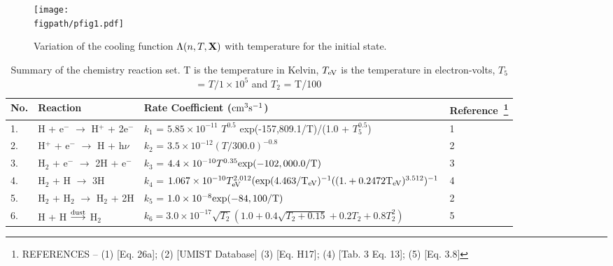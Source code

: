 \documentclass[useAMS,usenatbib]{mn2e}
\newcommand{\figpath}{/home/phybva/SiOJets_New/PAPER/NEWFIGS}
\begin{document}
\begin{figure}
\texttt{[image: \\figpath/pfig1.pdf]}
 \caption{Variation of the cooling
   function $\Lambda(n,T,{\bf{X}})$ with temperature for the initial
   state.}
\label{fig:tempvar}
\end{figure}

\begin{table*}
\begin{minipage}{\textwidth}
\caption{Summary of the chemistry reaction set. T is the temperature
  in Kelvin, $T_{\rm eV}$ is the temperature in electron-volts, $T_{5}$
  = $T/1\times10^{5}$  and 
$T_{2}$  = T/100}
\label{tab:chemeq}
\begin{tabular}{l l l l}
\hline
No. & Reaction & Rate Coefficient ($\rm {cm}^{3} s^{-1}$) &
Reference~\footnote{REFERENCES -- (1) \cite{Cen:1992p13616} [Eq. 26a];
  (2) \cite{Woodall:2007p13623} [UMIST Database] (3)
  \cite{Galli:1998p13066} [Eq. H17]; (4) \cite{Abel:1997p12836}
  [Tab. 3 Eq. 13]; (5) \cite{Hollenbach:1979p12707} [Eq. 3.8]}\\
\hline
1. & H + e$^{-}$ $\rightarrow$ H$^{+}$ + 2e$^{-}$ & $k_1$ = $5.85
\times 10^{-11}$ $T^{0.5}$ \rm{exp}(-157,809.1/T)/(1.0 + $T_{5}^{0.5}$) & 1\\
2. & H$^{+}$ + e$^{-}$ $\rightarrow$ H + h$\nu$ & $k_2$ =
$3.5\times10^{-12} (T/300.0)^{-0.8}$ & 2\\
3. & H$_{2}$ + e$^{-}$ $\rightarrow$ 2H + e$^{-}$ & $k_3$ =
$4.4\times10^{-10} T^{0.35} \rm{exp}(-102,000.0/T)$ & 3\\
4. & H$_{2}$ + H $\rightarrow$ 3H & $k_4$ = $1.067\times10^{-10}
T_{\rm eV}^{2.012}(\rm{exp}(4.463/T_{\rm eV})^{-1}((1. + 0.2472 T_{\rm eV})^{3.512})^{-1} $& 4\\
5. &H$_{2}$ + H$_{2}$ $\rightarrow$ H$_{2}$ + 2H & $k_5$ = $1.0\times 10^{-8} \rm{exp}(-84,100/T)$ & 2\\
6. & H + H $\overset{\rm dust}\longrightarrow$ H$_{2}$ & $k_6 =
3.0\times10^{-17}\sqrt{T_{2}}(1.0 + 0.4\sqrt{T_{2} + 0.15} + 0.2T_{2} + 0.8T_{2}^{2})$ & 5 \\
\hline
\end{tabular}
\end{minipage}
\end{table*}
\end{document}
